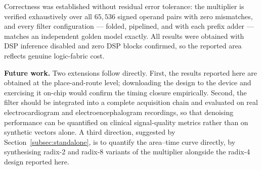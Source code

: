 \documentclass[conference]{IEEEtran}
\begin{document}
Correctness was established without residual error tolerance: the
multiplier is verified exhaustively over all $65{,}536$ signed operand
pairs with zero mismatches, and every filter configuration --- folded,
pipelined, and with each prefix adder --- matches an independent golden
model exactly. All results were obtained with DSP inference disabled and
zero DSP blocks confirmed, so the reported area reflects genuine
logic-fabric cost.

\smallskip\noindent\textbf{Future work.} Two extensions follow
directly. First, the results reported here are obtained at the
place-and-route level; downloading the design to the device and
exercising it on-chip would confirm the timing closure empirically.
Second, the filter should be integrated into a complete acquisition
chain and evaluated on real electrocardiogram and electroencephalogram
recordings, so that denoising performance can be quantified on clinical
signal-quality metrics rather than on synthetic vectors alone. A third
direction, suggested by Section~\ref{subsec:standalone}, is to quantify
the area--time curve directly, by synthesising radix-2 and radix-8
variants of the multiplier alongside the radix-4 design reported here.
\end{document}
